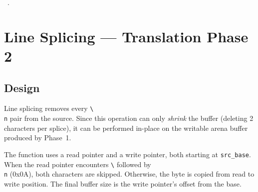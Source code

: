 \documentclass[11pt,a4paper,twoside,openright,DIV=15]{scrbook}
\theoremstyle{definition}
\theoremstyle{plain}
\theoremstyle{remark}
\begin{document}
\begin{flushleft}
\begin{minipage}{\linewidth}
\vspace{-1.5ex}
\footnotesize
\begin{list}{}{\setlength{\itemsep}{-\parsep}\setlength{\itemindent}{-\leftmargin}}
\item \NWtxtMacroRefIn\ .

\item{}
\end{list}
\end{minipage}\vspace{4ex}
\end{flushleft}
%
%

\chapter{Line Splicing --- Translation Phase 2}
\label{ch:line-splicing}

\section{Design}

Line splicing removes every \texttt{\textbackslash}\texttt{\\n} pair
from the source.  Since this operation can only \emph{shrink} the
buffer (deleting 2 characters per splice), it can be performed
in-place on the writable arena buffer produced by Phase~1.

The function uses a read pointer and a write pointer, both starting
at \texttt{src\_base}.  When the read pointer encounters
\texttt{\textbackslash} followed by \texttt{\\n} (0x0A), both
characters are skipped.  Otherwise, the byte is copied from read
to write position.  The final buffer size is the write pointer's
offset from the base.
\end{document}
